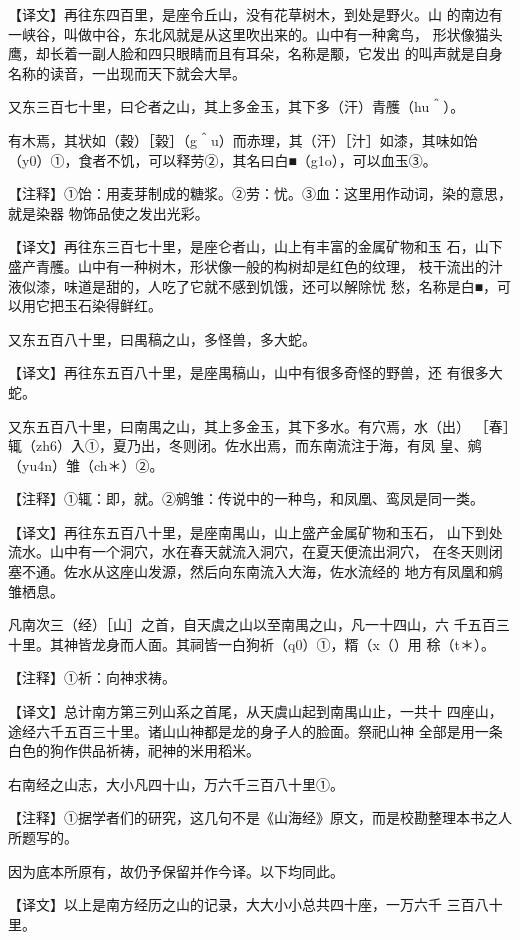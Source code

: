 \documentclass[a4paper,12pt,UTF8,twoside]{ctexbook}
\begin{document}
【译文】再往东四百里，是座令丘山，没有花草树木，到处是野火。山 的南边有一峡谷，叫做中谷，东北风就是从这里吹出来的。山中有一种禽鸟， 形状像猫头鹰，却长着一副人脸和四只眼睛而且有耳朵，名称是颙，它发出 的叫声就是自身名称的读音，一出现而天下就会大旱。

又东三百七十里，曰仑者之山，其上多金玉，其下多（汗）青雘（hu＾）。

有木焉，其状如（穀）［榖］（g＾u）而赤理，其（汗）［汁］如漆，其味如饴 （y0）①，食者不饥，可以释劳②，其名曰白■（g1o），可以血玉③。

【注释】①饴：用麦芽制成的糖浆。②劳：忧。③血：这里用作动词，染的意思，就是染器 物饰品使之发出光彩。

【译文】再往东三百七十里，是座仑者山，山上有丰富的金属矿物和玉 石，山下盛产青雘。山中有一种树木，形状像一般的构树却是红色的纹理， 枝干流出的汁液似漆，味道是甜的，人吃了它就不感到饥饿，还可以解除忧 愁，名称是白■，可以用它把玉石染得鲜红。

又东五百八十里，曰禺稿之山，多怪兽，多大蛇。

【译文】再往东五百八十里，是座禺稿山，山中有很多奇怪的野兽，还 有很多大蛇。

又东五百八十里，曰南禺之山，其上多金玉，其下多水。有穴焉，水（出） ［春］辄（zh6）入①，夏乃出，冬则闭。佐水出焉，而东南流注于海，有凤 皇、鹓（yu4n）雏（ch＊）②。

【注释】①辄：即，就。②鹓雏：传说中的一种鸟，和凤凰、鸾凤是同一类。

【译文】再往东五百八十里，是座南禺山，山上盛产金属矿物和玉石， 山下到处流水。山中有一个洞穴，水在春天就流入洞穴，在夏天便流出洞穴， 在冬天则闭塞不通。佐水从这座山发源，然后向东南流入大海，佐水流经的 地方有凤凰和鹓雏栖息。

凡南次三（经）［山］之首，自天虞之山以至南禺之山，凡一十四山，六 千五百三十里。其神皆龙身而人面。其祠皆一白狗祈（q0）①，糈（x（）用 稌（t＊）。

【注释】①祈：向神求祷。

【译文】总计南方第三列山系之首尾，从天虞山起到南禺山止，一共十 四座山，途经六千五百三十里。诸山山神都是龙的身子人的脸面。祭祀山神 全部是用一条白色的狗作供品祈祷，祀神的米用稻米。

右南经之山志，大小凡四十山，万六千三百八十里①。

【注释】①据学者们的研究，这几句不是《山海经》原文，而是校勘整理本书之人所题写的。

因为底本所原有，故仍予保留并作今译。以下均同此。

【译文】以上是南方经历之山的记录，大大小小总共四十座，一万六千 三百八十里。
\end{document}
